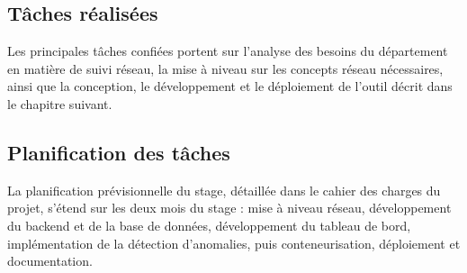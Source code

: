 \subsection{Tâches réalisées}

Les principales tâches confiées portent sur l'analyse des besoins du département en
matière de suivi réseau, la mise à niveau sur les concepts réseau nécessaires, ainsi que
la conception, le développement et le déploiement de l'outil décrit dans le chapitre
suivant.

\subsection{Planification des tâches}

La planification prévisionnelle du stage, détaillée dans le cahier des charges du
projet, s'étend sur les deux mois du stage : mise à niveau réseau, développement du
backend et de la base de données, développement du tableau de bord, implémentation de la
détection d'anomalies, puis conteneurisation, déploiement et documentation.
